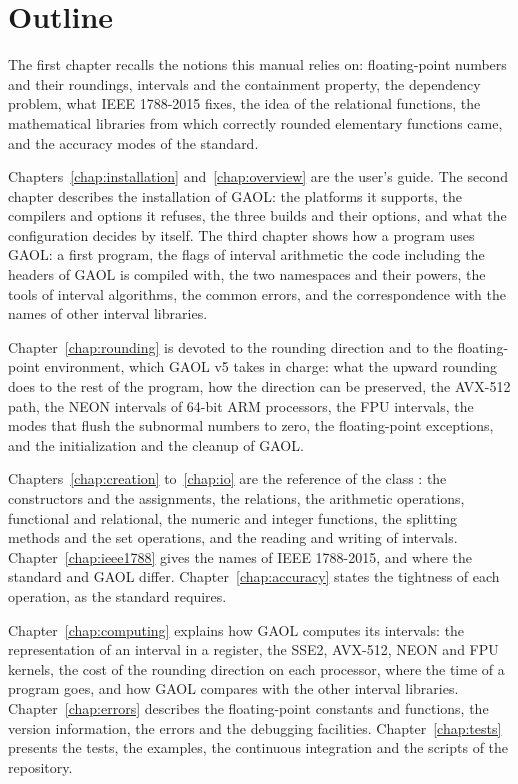 \documentclass[12pt,a4paper,twoside,openright]{book}
\begin{document}
\section*{Outline}

The first chapter recalls the notions this manual relies on: floating-point
numbers and their roundings, intervals and the containment property, the
dependency problem, what IEEE 1788-2015 fixes, the idea of the relational
functions, the mathematical libraries from which correctly rounded
elementary functions came, and the accuracy modes of the standard.

\medskip
Chapters~\ref{chap:installation} and~\ref{chap:overview} are the user's
guide. The second chapter describes the installation of GAOL: the platforms
it supports, the compilers and options it refuses, the three builds and their
options, and what the configuration decides by itself. The third chapter
shows how a program uses GAOL: a first program, the flags of interval
arithmetic the code including the headers of GAOL is compiled with, the two
namespaces and their powers, the tools of interval algorithms, the common
errors, and the correspondence with the names of other interval libraries.

\medskip
Chapter~\ref{chap:rounding} is devoted to the rounding direction and to the
floating-point environment, which GAOL v5 takes in charge: what the upward
rounding does to the rest of the program, how the direction can be
preserved, the AVX-512 path, the NEON intervals of 64-bit ARM processors, the
FPU intervals, the modes that flush the subnormal numbers to zero, the
floating-point exceptions, and the initialization and the cleanup of GAOL.

\medskip
Chapters~\ref{chap:creation} to~\ref{chap:io} are the reference of the class
: the constructors and the assignments, the relations, the
arithmetic operations, functional and relational, the numeric and integer
functions, the splitting methods and the set operations, and the reading and
writing of intervals. Chapter~\ref{chap:ieee1788} gives the names of IEEE
1788-2015, and where the standard and GAOL differ. Chapter~\ref{chap:accuracy}
states the tightness of each operation, as the standard requires.

\medskip
Chapter~\ref{chap:computing} explains how GAOL computes its intervals: the
representation of an interval in a register, the SSE2, AVX-512, NEON and FPU
kernels, the cost of the rounding direction on each processor, where the
time of a program goes, and how GAOL compares with the other interval
libraries. Chapter~\ref{chap:errors} describes the floating-point constants
and functions, the version information, the errors and the debugging
facilities. Chapter~\ref{chap:tests} presents the tests, the examples, the
continuous integration and the scripts of the repository.
\end{document}
